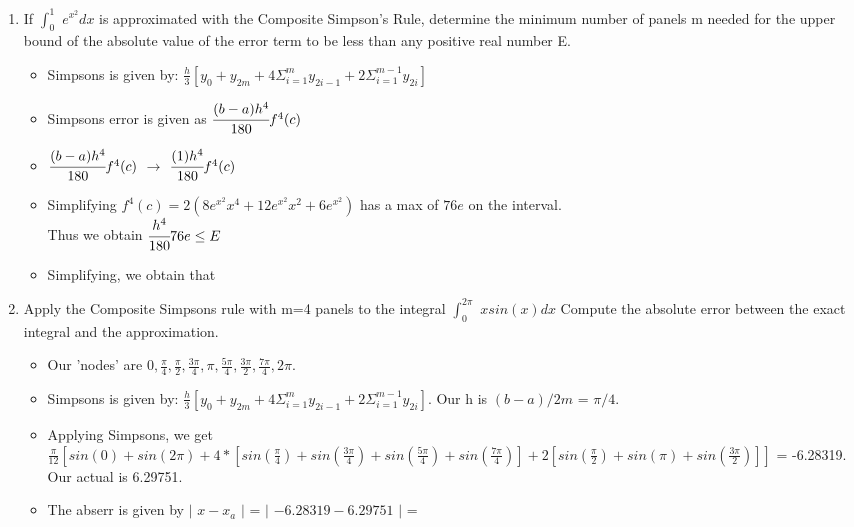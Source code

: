 \documentclass[12pt]{article}
\begin{document}
\begin{enumerate}
	\item If $\int_0^1$ $e^{x^2}dx$ is approximated with the Composite Simpson’s Rule, determine the minimum number of panels m needed for the upper bound of the absolute value of the error term to be less than any positive real number E.
	\begin{itemize}
		\item Simpsons is given by: $\frac{h}{3}[y_0 + y_{2m}+4\Sigma_{i=1}^m y_{2i-1} + 2\Sigma_{i=1}^{m-1} y_{2i}]$
		\item Simpsons error is given as $\cfrac{(b-a)h^4}{180}f^4(c)$
		\item $\cfrac{(b-a)h^4}{180}f^4(c)$ $\rightarrow$ $\cfrac{(1)h^4}{180}f^4(c)$
		\item Simplifying $f^4(c) = 2(8e^{x^2}x^4 +12e^{x^2}x^2 + 6e^{x^2})$ has a max of $76e$ on the interval. \\
		Thus we obtain $\cfrac{h^4}{180}76e \leq E$
		\item Simplifying, we obtain that 
	\end{itemize}
	
	\item Apply the Composite Simpsons rule with m=4 panels to the integral $\int_0^{2\pi}$ $xsin(x)dx$ Compute the absolute error between the exact integral and the approximation. 
	\begin{itemize}
		\item Our 'nodes' are $0, \frac{\pi}{4}, \frac{\pi}{2}, \frac{3\pi}{4}, \pi, \frac{5\pi}{4}, \frac{3\pi}{2}, \frac{7\pi}{4}, 2\pi$.
		\item Simpsons is given by: $\frac{h}{3}[y_0 + y_{2m}+4\Sigma_{i=1}^m y_{2i-1} + 2\Sigma_{i=1}^{m-1} y_{2i}]$. Our h is $(b-a)/2m$ = $\pi/4$.
		\item Applying Simpsons, we get $\frac{\pi}{12}[sin(0) + sin(2\pi) + 4*[sin(\frac{\pi}{4})+sin(\frac{3\pi}{4})+sin(\frac{5\pi}{4})+sin(\frac{7\pi}{4})] + 2[sin(\frac{\pi}{2}) + sin(\pi) + sin(\frac{3\pi}{2})]]$ = -6.28319. Our actual is 6.29751. 
		\item The abserr is given by $|$ $x - x_a$ $|$ = $|$ $-6.28319 - 6.29751$ $|$ = 
	\end{itemize}
	

\end{enumerate}
\end{document}
